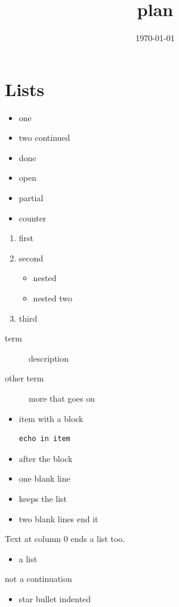 \documentclass[11pt]{article}
\author{}
\date{\today}
\title{plan}
\begin{document}
\maketitle
\tableofcontents

\section{Lists}
\label{org2f124dc1}

\begin{itemize}
\item one
\item two
continued
\item[$\boxtimes$] done
\item[$\square$] open
\item[$\boxminus$] partial
\item counter
\end{itemize}

\begin{enumerate}
\item first
\item second

\begin{itemize}
\item nested
\item nested two
\end{itemize}
\item third
\end{enumerate}

\begin{description}
\item[{term}] description
\item[{other term}] more
that goes on
\end{description}

\begin{itemize}
\item item with a block

\begin{verbatim}
echo in item
\end{verbatim}
\item after the block
\end{itemize}

\begin{itemize}
\item one blank line
\item keeps the list
\end{itemize}

\begin{itemize}
\item two blank lines end it
\end{itemize}

Text at column 0 ends a list too.

\begin{itemize}
\item a list
\end{itemize}

not a continuation

\begin{itemize}
\item star bullet indented
\end{itemize}
\end{document}
